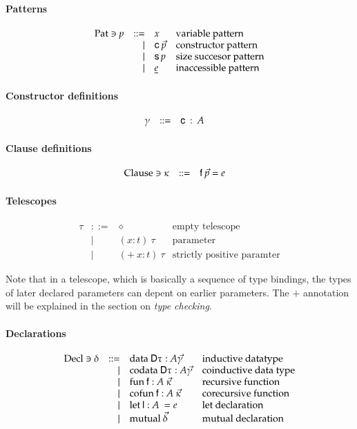 \paragraph*{Patterns}
\[
\begin{array}{lrll}
\mathrm{Pat} \ni p & ::= & x & \mbox{variable pattern}\\
& \mid & \mathsf{c} \: \vec{p} & \mbox{constructor pattern}\\
& \mid & \mathsf{s}\, p & \mbox{size succesor pattern}\\
& \mid & \underline{e} & \mbox{inaccessible pattern}\\
\end{array}
\]

\paragraph*{Constructor definitions}
\[
\begin{array}{lrll}
\gamma &  ::= & \mathsf{c} \: : \: A & 
\end{array}
\]

\paragraph*{Clause definitions}
\[
\begin{array}{lrll}
\mathrm{Clause} \ni \kappa & ::= & \mathsf{f} \: \vec{p} = e & 
\end{array}
\]

\paragraph*{Telescopes}
\[
\begin{array}{lrll}
\tau & ::= & \diamond & \mbox{empty telescope}\\
& \mid & ( x : t ) \: \tau & \mbox{parameter}\\
& \mid & ( + \: x : t ) \: \tau & \mbox{strictly positive paramter}
\end{array}
\]

Note that in a telescope, which is basically a sequence of type bindings, the types of later declared parameters can depent on earlier parameters. The $+$ annotation will be explained in the section on \emph{type checking}. 

\paragraph*{Declarations}
\[
\begin{array}{lrll}
\mathrm{Decl} \ni \delta & ::= & \mathrm{data}\: \mathsf{D} \tau : A \vec{\gamma} & \mbox{inductive datatype}\\ 
& \mid & \mathrm{codata}\: \mathsf{D} \tau : A \vec{\gamma} & \mbox{coinductive data type} \\
& \mid & \mathrm{fun}\: \mathsf{f} : A \: \vec{\kappa} & \mbox{recursive function}\\
& \mid & \mathrm{cofun}\: \mathsf{f} : A \: \vec{\kappa} & \mbox{corecursive function}\\ 
& \mid & \mathrm{let}\: \mathsf{l} : A \: = e & \mbox{let declaration}\\
& \mid & \mathrm{mutual}\: \vec{\delta} & \mbox{mutual declaration}
\end{array}
\]



